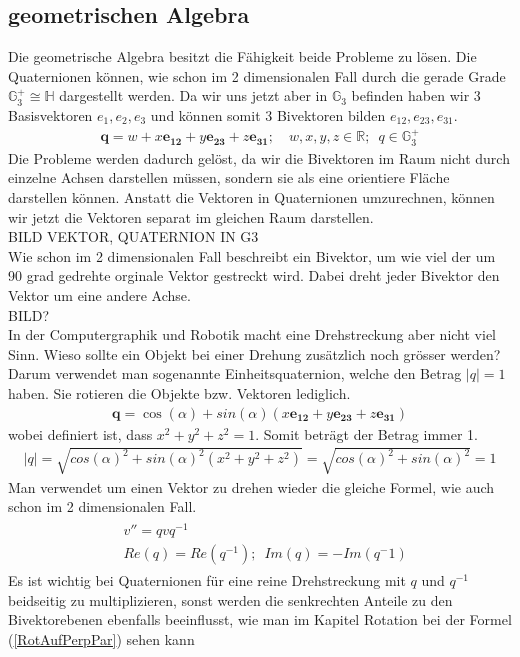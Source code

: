\subsection{geometrischen Algebra}
Die geometrische Algebra besitzt die Fähigkeit beide Probleme zu lösen. Die Quaternionen können, wie schon im 2 dimensionalen Fall durch die gerade Grade $\mathbb{G}_3^+ \cong \mathbb{H}$ dargestellt werden. Da wir uns jetzt aber in $\mathbb{G}_3$ befinden haben wir 3 Basisvektoren $e_1, e_2, e_3$ und können somit 3 Bivektoren bilden $e_{12}, e_{23}, e_{31}$.
\begin{align}
	\mathbf{q} = w + x\mathbf{e_{12}} + y\mathbf{e_{23}} + z\mathbf{e_{31}}; \quad w,x,y,z \in \mathbb{R};\enspace q \in \mathbb{G}_3^+
\end{align}
Die Probleme werden dadurch gelöst, da wir die Bivektoren im Raum nicht durch einzelne Achsen darstellen müssen, sondern sie als eine orientiere Fläche darstellen können. Anstatt die Vektoren in Quaternionen umzurechnen, können wir jetzt die Vektoren separat im gleichen Raum darstellen. 
\\BILD VEKTOR, QUATERNION IN G3\\
Wie schon im 2 dimensionalen Fall beschreibt ein Bivektor, um wie viel der um 90 grad gedrehte orginale Vektor gestreckt wird. Dabei dreht jeder Bivektor den Vektor um eine andere Achse.
\\BILD?\\
In der Computergraphik und Robotik macht eine Drehstreckung aber nicht viel Sinn. Wieso sollte ein Objekt bei einer Drehung zusätzlich noch grösser werden? Darum verwendet man sogenannte Einheitsquaternion, welche den Betrag $|q|=1$ haben. Sie rotieren die Objekte bzw. Vektoren lediglich.
\begin{align}
	\mathbf{q} = \cos(\alpha) + sin(\alpha)(x\mathbf{e_{12}} + y\mathbf{e_{23}} + z\mathbf{e_{31}})
\end{align}
wobei definiert ist, dass $x^2+y^2+z^2=1$. Somit beträgt der Betrag immer 1.
\begin{align}
	|q| = \sqrt{cos(\alpha)^2 + sin(\alpha)^2(x^2+y^2+z^2) } = \sqrt{cos(\alpha)^2 + sin(\alpha)^2} = 1
\end{align}
Man verwendet um einen Vektor zu drehen wieder die gleiche Formel, wie auch schon im 2 dimensionalen Fall.
\begin{align} \label{QuatRot}
	\begin{split} 
		&v'' = qvq^{-1}\\
		&Re(q) = Re(q^{-1});\enspace Im(q) = -Im(q^-1)
	\end{split}
\end{align}
Es ist wichtig bei Quaternionen für eine reine Drehstreckung mit $q$ und $q^{-1}$ beidseitig zu multiplizieren, sonst werden die senkrechten Anteile zu den Bivektorebenen ebenfalls beeinflusst, wie man im Kapitel Rotation bei der Formel (\ref{RotAufPerpPar}) sehen kann

